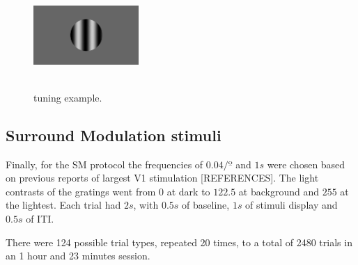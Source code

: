 \begin{figure}[H] \centering \includegraphics[width=4cm,height=4cm,keepaspectratio]{Figures/4.Chapter/tuning.png} \caption{tuning example.} \end{figure}

\subsection{Surround Modulation stimuli}
\label{subsec:subcsectionC}

Finally, for the SM protocol the frequencies of $0.04 /º$ and $1 s$ were chosen based on previous reports of largest V1 stimulation [REFERENCES]. The light contrasts of the gratings went from $0$ at dark to $122.5$ at background and $255$ at the lightest. Each trial had $2 s$, with $0.5 s$ of baseline, $1 s$ of stimuli display and $0.5 s$ of ITI. 

There were 124 possible trial types, repeated 20 times, to a total of 2480 trials in an 1 hour and 23 minutes session.

 \begin{table}[H]
\begin{center}\par
{}
 \caption{Configurations regarding the SM protocol stimuli properties.}
    \vspace{-5mm}
    \label{table:SM}
\end{center}
\end{table}


